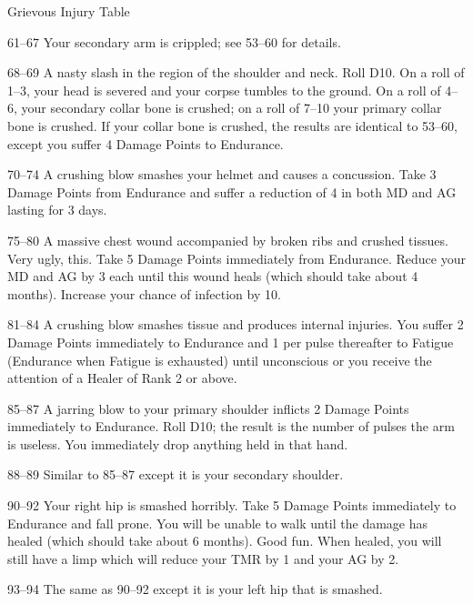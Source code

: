 \begin{Chapter}{Grievous Injury Table}
\begin{Description}
\item[61–67] Your secondary arm is crippled; see 53–60 for details.

\item[68–69] A nasty slash in the region of the shoulder and
  neck. Roll D10. On a roll of 1–3, your head is severed and your
  corpse tumbles to the ground. On a roll of 4–6, your secondary
  collar bone is crushed; on a roll of 7–10 your primary collar bone
  is crushed. If your collar bone is crushed, the results are
  identical to 53–60, except you suffer 4 Damage Points to Endurance.

\item[70–74] A crushing blow smashes your helmet and causes a
  concussion. Take 3 Damage Points from Endurance and suffer a
  reduction of 4 in both MD and AG lasting for 3 days.

\item[75–80] A massive chest wound accompanied by broken ribs and
  crushed tissues. Very ugly, this. Take 5 Damage Points immediately
  from Endurance. Reduce your MD and AG by 3 each until this wound
  heals (which should take about 4 months).  Increase your chance of
  infection by 10.

\item[81–84] A crushing blow smashes tissue and produces internal
  injuries. You suffer 2 Damage Points immediately to Endurance and 1
  per pulse thereafter to Fatigue (Endurance when Fatigue is
  exhausted) until unconscious or you receive the attention of a
  Healer of Rank 2 or above.

\item[85–87] A jarring blow to your primary shoulder inflicts 2 Damage
  Points immediately to Endurance. Roll D10; the result is the number
  of pulses the arm is useless. You immediately drop anything held in
  that hand.

\item[88–89] Similar to 85–87 except it is your secondary shoulder.

\item[90–92] Your right hip is smashed horribly. Take 5 Damage Points
  immediately to Endurance and fall prone. You will be unable to walk
  until the damage has healed (which should take about 6 months). Good
  fun.  When healed, you will still have a limp which will reduce your
  TMR by 1 and your AG by 2.


\item[93–94]   The same as 90–92 except it is your left hip that is smashed. 


\end{Description}
\end{Chapter}
